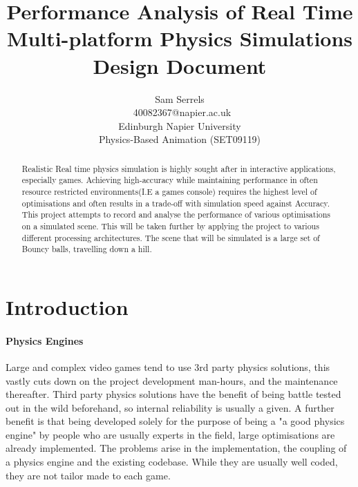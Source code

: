\documentclass[conference]{acmsiggraph}
\title{Performance Analysis of Real Time Multi-platform Physics Simulations \\
	   Design Document}
\author{Sam Serrels\\\ 40082367@napier.ac.uk \\
Edinburgh Napier University\\
Physics-Based Animation (SET09119)}
\begin{document}

\maketitle

\begin{abstract}
Realistic Real time physics simulation is highly sought after in interactive applications, especially games. Achieving high-accuracy while maintaining performance in often resource restricted environments(I.E a games console) requires the highest level of optimisations and often results in a trade-off with simulation speed against Accuracy. This project attempts to record and analyse the performance of various optimisations on a simulated scene. This will be taken further by applying the project to various different processing architectures. The scene that will be simulated is a large set of Bouncy balls, travelling down a hill.
\end{abstract}

\keywordlist

\section{Introduction}

\paragraph{Physics Engines}
Large and complex video games tend to use 3rd party physics solutions, this vastly cuts down on the project development man-hours, and the maintenance thereafter. Third party physics solutions have the benefit of being battle tested out in the wild beforehand, so internal reliability is usually a given. A further benefit is that being developed solely for the purpose of being a "a good physics engine" by people who are usually experts in the field, large optimisations are already implemented. The problems arise in the implementation, the coupling of a physics engine and the existing codebase. While they are usually well coded, they are not tailor made to each game. 
\end{document}
